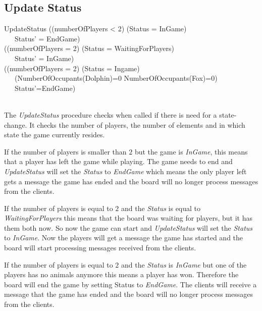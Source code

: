 \documentclass[a4paper,twoside,11pt]{book}
\begin{document}

\subsection{Update Status} %
\label{sub:update_status}
\begin{schema}{UpdateStatus}
    \ST
    ((numberOfPlayers < 2) \wedge (Status = InGame)\\
    \ \ \ Status' = EndGame) \vee\\
    ((numberOfPlayers = 2) \wedge (Status = WaitingForPlayers) \\
    \ \ \ Status' = InGame) \vee\\
    ((numberOfPlayers = 2) \wedge (Status = Ingame) \wedge \\
    \ \ \ (NumberOfOccupants(Dolphin)=0 \vee NumberOfOccupants(Fox)=0)\\
    \ \ \ Status'=EndGame)\\
\end{schema} \\

The \emph{UpdateStatus} procedure checks when called if there is need for a state-change. It checks the number of players, the number of elements and in which state the game currently resides.

If the number of players is smaller than $2$ but the game is \emph{InGame}, this means that a player has left the game while playing. The game needs to end and \emph{UpdateStatus} will set the \emph{Status} to \emph{EndGame} which means the only player left gets a message the game has ended and the board will no longer process messages from the clients.

If the number of players is equal to $2$ and the \emph{Status} is equal to \emph{WaitingForPlayers} this means that the board was waiting for players, but it has them both now. So now the game can start and \emph{UpdateStatus} will set the \emph{Status} to \emph{InGame}. Now the players will get a message the game has started and the board will start processing messages received from the clients.

If the number of players is equal to $2$ and the \emph{Status} is \emph{InGame} but one of the players has no animals anymore this means a player has won. Therefore the board will end the game by setting Status to \emph{EndGame}. The clients will receive a message that the game has ended and the board will no longer process messages from the clients.
\end{document}
